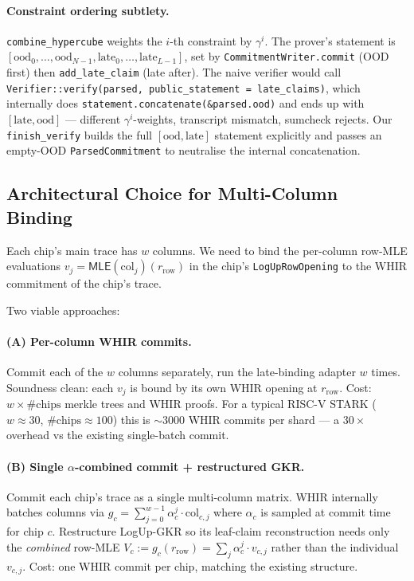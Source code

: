 \paragraph{Constraint ordering subtlety.}
\texttt{combine\_hypercube} weights the $i$-th constraint by
$\gamma^i$.  The prover's statement is
$[\mathrm{ood}_0, \ldots, \mathrm{ood}_{N-1}, \mathrm{late}_0,
\ldots, \mathrm{late}_{L-1}]$, set by
\texttt{CommitmentWriter.commit} (OOD first) then
\texttt{add\_late\_claim} (late after).  The naive verifier would call
\texttt{Verifier::verify(parsed, public\_statement = late\_claims)},
which internally does \texttt{statement.concatenate(\&parsed.ood)} and
ends up with $[\mathrm{late}, \mathrm{ood}]$ --- different
$\gamma^i$-weights, transcript mismatch, sumcheck rejects.  Our
\texttt{finish\_verify} builds the full $[\mathrm{ood}, \mathrm{late}]$
statement explicitly and passes an empty-OOD \texttt{ParsedCommitment}
to neutralise the internal concatenation.

\subsection{Architectural Choice for Multi-Column Binding}

Each chip's main trace has $w$ columns.  We need to bind the
per-column row-MLE evaluations $v_j = \mathsf{MLE}(\mathrm{col}_j)
(r_{\mathrm{row}})$ in the chip's \texttt{LogUpRowOpening} to the
WHIR commitment of the chip's trace.

Two viable approaches:

\paragraph{(A) Per-column WHIR commits.}
Commit each of the $w$ columns separately, run the late-binding
adapter $w$ times.  Soundness clean: each $v_j$ is bound by its own
WHIR opening at $r_{\mathrm{row}}$.  Cost: $w \times \#\mathrm{chips}$
merkle trees and WHIR proofs.  For a typical RISC-V STARK
($w \approx 30$, $\#\mathrm{chips} \approx 100$) this is $\sim 3000$
WHIR commits per shard --- a $30\times$ overhead vs the existing
single-batch commit.

\paragraph{(B) Single $\alpha$-combined commit + restructured GKR.}
Commit each chip's trace as a single multi-column matrix.  WHIR
internally batches columns via $g_c = \sum_{j=0}^{w-1} \alpha_c^j
\cdot \mathrm{col}_{c,j}$ where $\alpha_c$ is sampled at commit time
for chip $c$.  Restructure LogUp-GKR so its leaf-claim reconstruction
needs only the \emph{combined} row-MLE
$V_c := g_c(r_{\mathrm{row}}) = \sum_j \alpha_c^j \cdot v_{c,j}$
rather than the individual $v_{c,j}$.  Cost: one WHIR commit per
chip, matching the existing structure.


